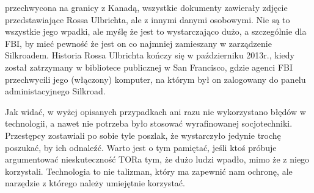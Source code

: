 \documentclass[polish]{kbk}
\begin{document}
przechwycona na granicy z Kanadą, wszystkie dokumenty zawierały zdjęcie przedstawiające
Rossa Ulbrichta, ale z innymi danymi osobowymi. Nie są to wszystkie jego wpadki, ale 
myślę że jest to wystarczająco dużo, a szczególnie dla FBI, by mieć pewność że jest
on co najmniej zamieszany w zarządzenie Silkroadem. Historia Rossa Ulbrichta kończy 
się w październiku 2013r., kiedy został zatrzymany w bibliotece publicznej w 
San Francisco, gdzie agenci FBI przechwycili jego (włączony) komputer, na którym 
był on zalogowany do panelu administacyjnego Silkroad.
\par
Jak widać, w wyżej opisanych przypadkach ani razu nie wykorzystano błędów w technologii,
a nawet nie potrzeba było stosować wyrafinowanej socjotechniki. 
Przestępcy zostawiali po sobie tyle poszlak, że wystarczyło jedynie trochę poszukać, by ich 
odnaleźć. Warto jest o tym pamiętać, jeśli ktoś próbuje argumentować nieskuteczność TORa 
tym, że dużo ludzi wpadło, mimo że z niego korzystali. Technologia to nie talizman, który
ma zapewnić nam ochronę, ale narzędzie z którego należy umiejętnie korzystać.
\end{document}
